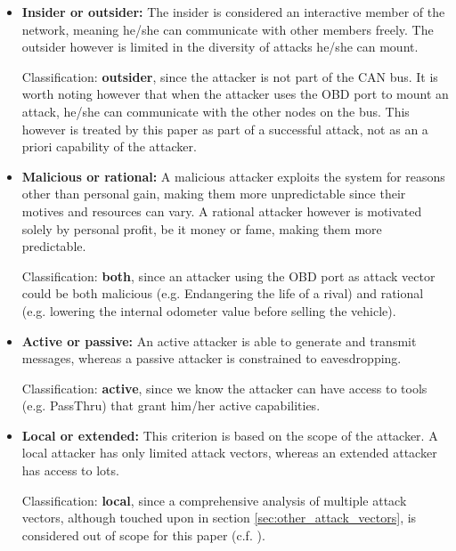 \documentclass[master=cws,masteroption=vs,english]{kulemt}
\begin{document}
\begin{itemize}
	\item \textbf{Insider or outsider:} The insider is considered an interactive member of the network, meaning he/she can communicate with other members freely. The outsider however is limited in the diversity of attacks he/she can mount.
	
	Classification: \textbf{outsider}, since the attacker is not part of the CAN bus. It is worth noting however that when the attacker uses the OBD port to mount an attack, he/she can communicate with the other nodes on the bus. This however is treated by this paper as part of a successful attack, not as an a priori capability of the attacker.
	
	\item \textbf{Malicious or rational:}  A malicious attacker exploits the system for reasons other than personal gain, making them more unpredictable since their motives and resources can vary. A rational attacker however is motivated solely by personal profit, be it money or fame, making them more predictable.
	
	Classification: \textbf{both}, since an attacker using the OBD port as attack vector could be both malicious (e.g. Endangering the life of a rival) and rational (e.g. lowering the internal odometer value before selling the vehicle).
	
	\item \textbf{Active or passive:} An active attacker is able to generate and transmit messages, whereas a passive attacker is constrained to eavesdropping.
	
	Classification: \textbf{active}, since we know the attacker can have access to tools (e.g. PassThru) that grant him/her active capabilities.
	
	\item \textbf{Local or extended:} This criterion is based on the scope of the attacker. A local attacker has only limited attack vectors, whereas an extended attacker has access to lots.
	
	Classification: \textbf{local}, since a comprehensive analysis of multiple attack vectors, although touched upon in section \ref{sec:other_attack_vectors}, is considered out of scope for this paper (c.f. \cite{Pike15}\cite{Kleberger15}\cite{Russel17}\cite{MillerA}\cite{Petit}\cite{Kosher}\cite{Kosher2}\cite{Bayer15}).
\end{itemize}
\end{document}
